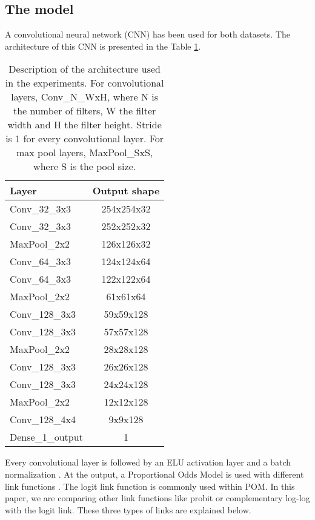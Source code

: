 \documentclass[10pt, a4paper, titlepage, twocolumn]{article}
\begin{document}
	\subsection{The model}
	A convolutional neural network (CNN) has been used for both datasets. The architecture of this CNN is presented in the Table \ref{table:CNNArchitecture}.
	
	\begin{table}[ht]
		\centering
		\begin{tabular}{|l|c|}
			\hline
			\textbf{Layer} & \textbf{Output shape}\\
			\hline
			Conv\_32\_3x3 & 254x254x32\\\hline
			Conv\_32\_3x3 & 252x252x32\\\hline
			MaxPool\_2x2 & 126x126x32\\\hline
			
			Conv\_64\_3x3 & 124x124x64\\\hline
			Conv\_64\_3x3 & 122x122x64\\\hline
			MaxPool\_2x2 & 61x61x64\\\hline
			
			Conv\_128\_3x3 & 59x59x128\\\hline
			Conv\_128\_3x3 & 57x57x128\\\hline
			MaxPool\_2x2 & 28x28x128\\\hline
			
			Conv\_128\_3x3 & 26x26x128\\\hline
			Conv\_128\_3x3 & 24x24x128\\\hline
			MaxPool\_2x2 & 12x12x128\\\hline
			
			Conv\_128\_4x4 & 9x9x128\\\hline
			Dense\_1\_output & 1\\
			\hline
		\end{tabular}
		\caption{Description of the architecture used in the experiments. For convolutional layers, Conv\_N\_WxH, where N is the number of filters, W the filter width and H the filter height. Stride is 1 for every convolutional layer. For max pool layers, MaxPool\_SxS, where S is the pool size.}
		\label{table:CNNArchitecture}
	\end{table}
	
	Every convolutional layer is followed by an ELU activation layer \cite{clevert2015fast} and a batch normalization \cite{ioffe2015batch}. At the output, a Proportional Odds Model is used with different link functions \cite{agresti2010analysis}. The logit link function is commonly used within POM. In this paper, we are comparing other link functions like probit or complementary log-log with the logit link. These three types of links are explained below.
	
\end{document}
